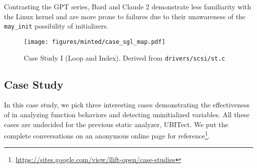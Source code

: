 Contrasting the GPT series, Bard and Claude 2 demonstrate less familiarity with the Linux kernel and are more prone to failures due to their unawareness of the \texttt{may\_init} possibility of initializers.







\begin{figure}
\hspace{-15pt}
\texttt{[image: figures/minted/case\_sgl\_map.pdf]}
    \caption{Case Study I (Loop and Index). Derived from \texttt{drivers/scsi/st.c} 
    }
    \label{fig:sgl_pages}
\end{figure}






\subsection{Case Study}
\label{subsec:case_study}
In this case study, we pick three interesting cases demonstrating the effectiveness of \work in analyzing function behaviors and detecting uninitialized variables. 
All these cases are undecided for the previous static analyzer, UBITect.
We put the complete conversations on an anonymous online page for reference\footnote{\href{https://sites.google.com/view/llift-open/case-studies}{https://sites.google.com/view/llift-open/case-studies}}.






